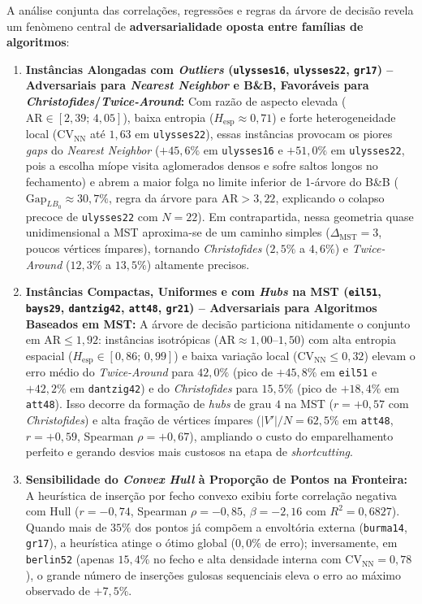 \documentclass[12pt]{article}
\begin{document}
A análise conjunta das correlações, regressões e regras da árvore de decisão revela um fenòmeno central de \textbf{adversarialidade oposta entre famílias de algoritmos}:

\begin{enumerate}
    \item \textbf{Instâncias Alongadas com \textit{Outliers} (\texttt{ulysses16}, \texttt{ulysses22}, \texttt{gr17}) -- Adversariais para \textit{Nearest Neighbor} e B\&B, Favoráveis para \textit{Christofides}/\textit{Twice-Around}:} Com razão de aspecto elevada ($\mathrm{AR} \in [2{,}39;\, 4{,}05]$), baixa entropia ($H_{\text{esp}} \approx 0{,}71$) e forte heterogeneidade local ($\mathrm{CV}_{\text{NN}}$ até $1{,}63$ em \texttt{ulysses22}), essas instâncias provocam os piores \textit{gaps} do \textit{Nearest Neighbor} ($+45{,}6\%$ em \texttt{ulysses16} e $+51{,}0\%$ em \texttt{ulysses22}, pois a escolha míope visita aglomerados densos e sofre saltos longos no fechamento) e abrem a maior folga no limite inferior de 1-árvore do B\&B ($\mathrm{Gap}_{LB_0} \approx 30{,}7\%$, regra da árvore para $\mathrm{AR} > 3{,}22$, explicando o colapso precoce de \texttt{ulysses22} com $N=22$). Em contrapartida, nessa geometria quase unidimensional a MST aproxima-se de um caminho simples ($\Delta_{\text{MST}}=3$, poucos vértices ímpares), tornando \textit{Christofides} ($2{,}5\%$ a $4{,}6\%$) e \textit{Twice-Around} ($12{,}3\%$ a $13{,}5\%$) altamente precisos.
    \item \textbf{Instâncias Compactas, Uniformes e com \textit{Hubs} na MST (\texttt{eil51}, \texttt{bays29}, \texttt{dantzig42}, \texttt{att48}, \texttt{gr21}) -- Adversariais para Algoritmos Baseados em MST:} A árvore de decisão particiona nitidamente o conjunto em $\mathrm{AR} \le 1{,}92$: instâncias isotrópicas ($\mathrm{AR} \approx 1{,}00$--$1{,}50$) com alta entropia espacial ($H_{\text{esp}} \in [0{,}86;\, 0{,}99]$) e baixa variação local ($\mathrm{CV}_{\text{NN}} \le 0{,}32$) elevam o erro médio do \textit{Twice-Around} para $42{,}0\%$ (pico de $+45{,}8\%$ em \texttt{eil51} e $+42{,}2\%$ em \texttt{dantzig42}) e do \textit{Christofides} para $15{,}5\%$ (pico de $+18{,}4\%$ em \texttt{att48}). Isso decorre da formação de \textit{hubs} de grau $4$ na MST ($r=+0{,}57$ com \textit{Christofides}) e alta fração de vértices ímpares ($|V'|/N = 62{,}5\%$ em \texttt{att48}, $r=+0{,}59$, Spearman $\rho=+0{,}67$), ampliando o custo do emparelhamento perfeito e gerando desvios mais custosos na etapa de \textit{shortcutting}.
    \item \textbf{Sensibilidade do \textit{Convex Hull} à Proporção de Pontos na Fronteira:} A heurística de inserção por fecho convexo exibiu forte correlação negativa com $\mathrm{Hull}$ ($r=-0{,}74$, Spearman $\rho=-0{,}85$, $\beta=-2{,}16$ com $R^2=0{,}6827$). Quando mais de $35\%$ dos pontos já compõem a envoltória externa (\texttt{burma14}, \texttt{gr17}), a heurística atinge o ótimo global ($0{,}0\%$ de erro); inversamente, em \texttt{berlin52} (apenas $15{,}4\%$ no fecho e alta densidade interna com $\mathrm{CV}_{\text{NN}}=0{,}78$), o grande número de inserções gulosas sequenciais eleva o erro ao máximo observado de $+7{,}5\%$.
\end{enumerate}
\end{document}
